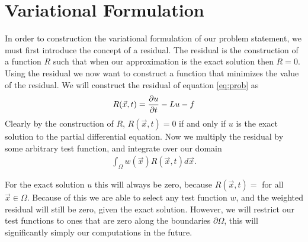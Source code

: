 \documentclass[../fem.tex]{subfile}
\begin{document}
\section{Variational Formulation}%
\label{sec:variational_formulation}

In order to construction the variational formulation of our problem statement,
we must first introduce the concept of a residual. The residual is the
construction of a function $R$ such that when our approximation is the exact
solution then $R=0$. Using the residual we now want to construct a function
that minimizes the value of the residual. We will construct the residual of
equation \ref{eq:prob} as
\begin{align*}
  R(\vec{x},t)=\frac{\partial u}{\partial t}-Lu-f
\end{align*}
Clearly by the construction of $R$, $R(\vec{x},t)=0$ if and only if $u$ is the
exact solution to the partial differential equation. Now we multiply the
residual by some arbitrary test function, and integrate over our domain
\begin{align*}
  \int_\Omega w(\vec{x})R(\vec{x},t)d\vec{x}.
\end{align*}

For the exact solution $u$ this will always be zero, because $R(\vec{x},t)=$
for all $\vec{x}\in\Omega$. Because of this we are able to select any test
function $w$, and the weighted residual will still be zero, given the exact
solution. However, we will restrict our test functions to ones that are zero
along the boundaries $\partial\Omega$, this will significantly simply our
computations in the future.
\end{document}
